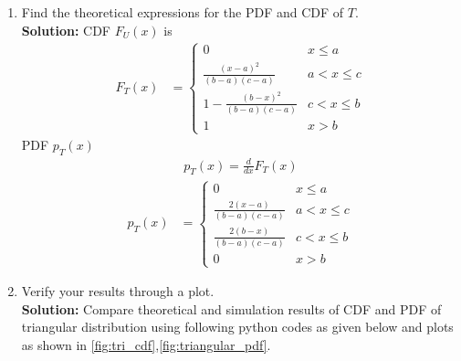 \documentclass{article}
\numberwithin{equation}{subsection}
\numberwithin{figure}{subsection}
\newcommand{\solution}{\noindent \textbf{Solution: }}
\renewcommand\thesection{\arabic{section}}
\renewcommand\thesubsection{\thesection.\arabic{subsection}}
\begin{document}
\begin{enumerate}[label=\thesubsection.\arabic*,ref=\thesubsection.\arabic{figure}]
\solution: The following PDF python code is to plot Fig.\ref{fig:tri_pdf11}
\begin{center}
\end{center}
\begin{center}
\end{center}
\begin{figure}
\centering
\texttt{[image: ../dig\_com/Figs/tri\_pdf1.pdf]} 
\caption{The CDF of $T$}
\label{fig:tri_pdf11}
\end{figure}
\item Find the theoretical expressions for the PDF and CDF of $T$.\\
\solution
CDF $F_U(x)$ is
\begin{align}
F_{T}(x) &= 
\begin{cases}
0 & x \leq a \\
\frac{(x-a)^2}{(b-a)(c-a)} & a < x \leq c \\
1-\frac{(b-x)^2}{(b-a)(c-a)} & c < x \leq b\\
1 & x > b
\end{cases}
\end{align}
PDF $p_T(x)$
\begin{align}
p_{T}(x) = \frac{d}{dx}F_{T}(x)
\end{align}
\begin{align}
p_{T}(x) &= 
\begin{cases}
0 & x \leq a \\
\frac{2(x-a)}{(b-a)(c-a)} & a < x \leq c \\
\frac{2(b-x)}{(b-a)(c-a)} & c < x \leq b\\
0 & x > b
\end{cases}
\end{align}
\item Verify your results through a plot. \\
\solution 
Compare theoretical and simulation results of CDF and PDF of triangular distribution using following python codes as given below and plots as shown in \ref{fig:tri_cdf},\ref{fig:triangular_pdf}.
\begin{center}

\end{center}
\end{enumerate}
\end{document}
